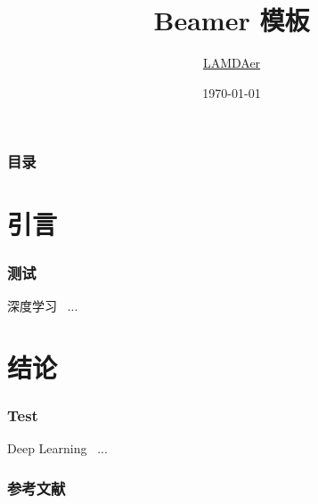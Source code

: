 \documentclass[aspectratio=169]{beamer}
\title{Beamer 模板}
\author{\href{mailto:}{LAMDAer}}
\institute{LAMDA, Nanjing University}
\date{\today}
\begin{document}
\frame{\titlepage}


\begin{frame}
\frametitle{目录}
\tableofcontents[hidesubsections]
\end{frame}

\section{引言}
\begin{frame}
\frametitle{测试}

深度学习~\cite{lecun2015deep} ...

\end{frame}

\section{结论}
\begin{frame}
\frametitle{Test}

Deep Learning~\cite{lecun2015deep} ...

\end{frame}


\begin{frame}
\frametitle{参考文献}
\printbibliography
\end{frame}
\end{document}
